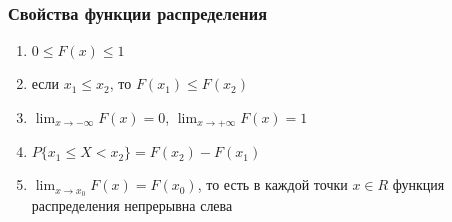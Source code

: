 \documentclass[a4paper, 14pt]{report}
\begin{document}
\subsubsection{Свойства функции распределения}

\begin{enumerate}
    \item $0 \le F(x) \le 1$
    \item если $x_1 \le x_2$, то $F(x_1) \le F(x_2)$
    \item $\lim_{x \to - \infty} F(x) = 0$, $\lim_{x \to +\infty} F(x) = 1$
    \item $P\{x_1 \le X < x_2\} = F(x_2) - F(x_1)$
    \item $\lim_{x \to x_0} F(x) = F(x_0)$, то есть в каждой точки $x \in R$ функция распределения непрерывна слева
\end{enumerate}
\end{document}
